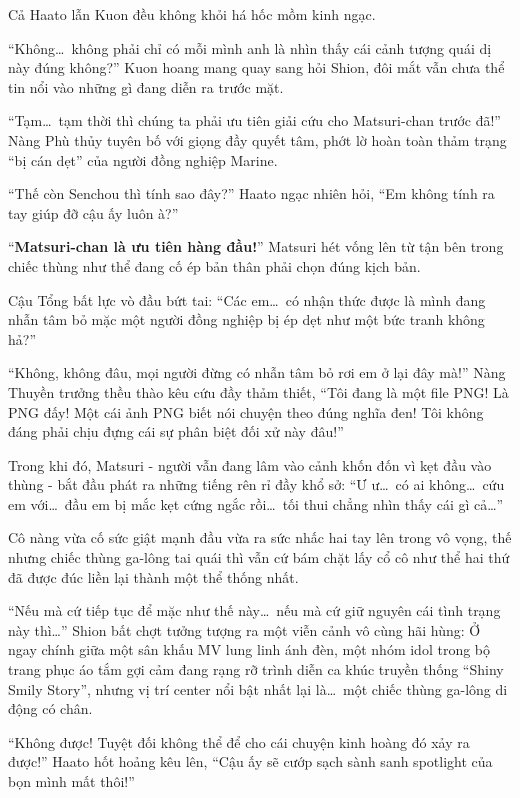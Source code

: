 \documentclass[../main.tex]{subfiles}
\begin{document}
Cả Haato lẫn Kuon đều không khỏi há hốc mồm kinh ngạc.

``Không\dots\ không phải chỉ có mỗi mình anh là nhìn thấy cái cảnh tượng quái dị này đúng không?'' Kuon hoang mang quay sang hỏi Shion, đôi mắt vẫn chưa thể tin nổi vào những gì đang diễn ra trước mặt.

``Tạm\dots\ tạm thời thì chúng ta phải ưu tiên giải cứu cho Matsuri-chan trước đã!'' Nàng Phù thủy tuyên bố với giọng đầy quyết tâm, phớt lờ hoàn toàn thảm trạng ``bị cán dẹt'' của người đồng nghiệp Marine.

``Thế còn Senchou thì tính sao đây?'' Haato ngạc nhiên hỏi, ``Em không tính ra tay giúp đỡ cậu ấy luôn à?''

``\textbf{Matsuri-chan là ưu tiên hàng đầu!}'' Matsuri hét vống lên từ tận bên trong chiếc thùng như thể đang cố ép bản thân phải chọn đúng kịch bản.

Cậu Tổng bất lực vò đầu bứt tai: ``Các em\dots\ có nhận thức được là mình đang nhẫn tâm bỏ mặc một người đồng nghiệp bị ép dẹt như một bức tranh không hả?''

``Không, không đâu, mọi người đừng có nhẫn tâm bỏ rơi em ở lại đây mà!'' Nàng Thuyền trưởng thều thào kêu cứu đầy thảm thiết, ``Tôi đang là một file PNG! Là PNG đấy! Một cái ảnh PNG biết nói chuyện theo đúng nghĩa đen! Tôi không đáng phải chịu đựng cái sự phân biệt đối xử này đâu!''

Trong khi đó, Matsuri - người vẫn đang lâm vào cảnh khốn đốn vì kẹt đầu vào thùng - bắt đầu phát ra những tiếng rên rỉ đầy khổ sở: ``Ư ư\dots\ có ai không\dots\ cứu em với\dots\ đầu em bị mắc kẹt cứng ngắc rồi\dots\ tối thui chẳng nhìn thấy cái gì cả\dots''

Cô nàng vừa cố sức giật mạnh đầu vừa ra sức nhấc hai tay lên trong vô vọng, thế nhưng chiếc thùng ga-lông tai quái thì vẫn cứ bám chặt lấy cổ cô như thể hai thứ đã được đúc liền lại thành một thể thống nhất.

``Nếu mà cứ tiếp tục để mặc như thế này\dots\ nếu mà cứ giữ nguyên cái tình trạng này thì\dots'' Shion bất chợt tưởng tượng ra một viễn cảnh vô cùng hãi hùng: Ở ngay chính giữa một sân khấu MV lung linh ánh đèn, một nhóm idol trong bộ trang phục áo tắm gợi cảm đang rạng rỡ trình diễn ca khúc truyền thống ``Shiny Smily Story'', nhưng vị trí center nổi bật nhất lại là\dots\ một chiếc thùng ga-lông di động có chân.

``Không được! Tuyệt đối không thể để cho cái chuyện kinh hoàng đó xảy ra được!'' Haato hốt hoảng kêu lên, ``Cậu ấy sẽ cướp sạch sành sanh spotlight của bọn mình mất thôi!''
\end{document}
